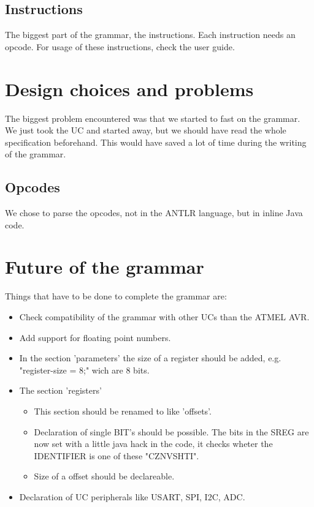 \subsection{Instructions}
The biggest part of the grammar, the instructions. Each instruction needs an opcode. For usage of these instructions, check the user guide.

\section{Design choices and problems}
The biggest problem encountered was that we started to fast on the grammar. We just took the \ac{UC} and started away, but we should have read the whole specification beforehand. This would have saved a lot of time during the writing of the grammar.

\subsection{Opcodes}
We chose to parse the opcodes, not in the ANTLR language, but in inline Java code. 

\section{Future of the grammar}
Things that have to be done to complete the grammar are:
\begin{itemize}
\item Check compatibility of the grammar with other \ac{UC}s than the ATMEL AVR.
\item Add support for floating point numbers.
\item In the section 'parameters' the size of a register should be added, e.g. "register-size = 8;" wich are 8 bits.
\item The section 'registers'
\begin{itemize}
\item This section should be renamed to like 'offsets'.
\item Declaration of single BIT's should be possible. The bits in the \ac{SREG} are now set with a little java hack in the code, it checks wheter the IDENTIFIER is one of these "CZNVSHTI".  
\item Size of a offset should be declareable.
\end{itemize}
\item Declaration of \ac{UC} peripherals like USART, SPI, I2C, ADC.
\end{itemize}
